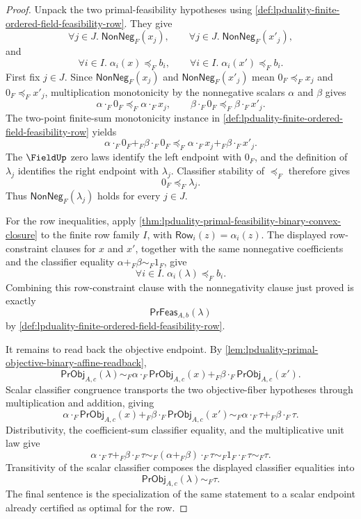 \begin{proof}
Unpack the two primal-feasibility hypotheses using \autoref{def:lpduality-finite-ordered-field-feasibility-row}. They give
$$
\forall j\in J.\;\mathsf{NonNeg}_F(x_j),
\qquad
\forall j\in J.\;\mathsf{NonNeg}_F(x'_j),
$$
and
$$
\forall i\in I.\;\alpha_i(x)\preceq_F b_i,
\qquad
\forall i\in I.\;\alpha_i(x')\preceq_F b_i.
$$
First fix $j\in J$. Since $\mathsf{NonNeg}_F(x_j)$ and $\mathsf{NonNeg}_F(x'_j)$ mean $0_F\preceq_Fx_j$ and $0_F\preceq_Fx'_j$, multiplication monotonicity by the nonnegative scalars $\alpha$ and $\beta$ gives
$$
\alpha\cdot_F0_F\preceq_F\alpha\cdot_Fx_j,
\qquad
\beta\cdot_F0_F\preceq_F\beta\cdot_Fx'_j.
$$
The two-point finite-sum monotonicity instance in \autoref{def:lpduality-finite-ordered-field-feasibility-row} yields
$$
\alpha\cdot_F0_F+_F\beta\cdot_F0_F
\preceq_F
\alpha\cdot_Fx_j+_F\beta\cdot_Fx'_j.
$$
The $\FieldUp$ zero laws identify the left endpoint with $0_F$, and the definition of $\lambda_j$ identifies the right endpoint with $\lambda_j$. Classifier stability of $\preceq_F$ therefore gives
$$
0_F\preceq_F\lambda_j.
$$
Thus $\mathsf{NonNeg}_F(\lambda_j)$ holds for every $j\in J$.

For the row inequalities, apply \autoref{thm:lpduality-primal-feasibility-binary-convex-closure} to the finite row family $I$, with $\mathsf{Row}_i(z)=\alpha_i(z)$. The displayed row-constraint clauses for $x$ and $x'$, together with the same nonnegative coefficients and the classifier equality $\alpha+_F\beta\sim_F1_F$, give
$$
\forall i\in I.\;\alpha_i(\lambda)\preceq_F b_i.
$$
Combining this row-constraint clause with the nonnegativity clause just proved is exactly
$$
\mathsf{PrFeas}_{A,b}(\lambda)
$$
by \autoref{def:lpduality-finite-ordered-field-feasibility-row}.

It remains to read back the objective endpoint. By \autoref{lem:lpduality-primal-objective-binary-affine-readback},
$$
\mathsf{PrObj}_{A,c}(\lambda)
\sim_F
\alpha\cdot_F\mathsf{PrObj}_{A,c}(x)+_F
\beta\cdot_F\mathsf{PrObj}_{A,c}(x').
$$
Scalar classifier congruence transports the two objective-fiber hypotheses through multiplication and addition, giving
$$
\alpha\cdot_F\mathsf{PrObj}_{A,c}(x)+_F
\beta\cdot_F\mathsf{PrObj}_{A,c}(x')
\sim_F
\alpha\cdot_F\tau+_F\beta\cdot_F\tau.
$$
Distributivity, the coefficient-sum classifier equality, and the multiplicative unit law give
$$
\alpha\cdot_F\tau+_F\beta\cdot_F\tau
\sim_F
(\alpha+_F\beta)\cdot_F\tau
\sim_F
1_F\cdot_F\tau
\sim_F
\tau.
$$
Transitivity of the scalar classifier composes the displayed classifier equalities into
$$
\mathsf{PrObj}_{A,c}(\lambda)\sim_F\tau.
$$
The final sentence is the specialization of the same statement to a scalar endpoint already certified as optimal for the row.
\end{proof}


